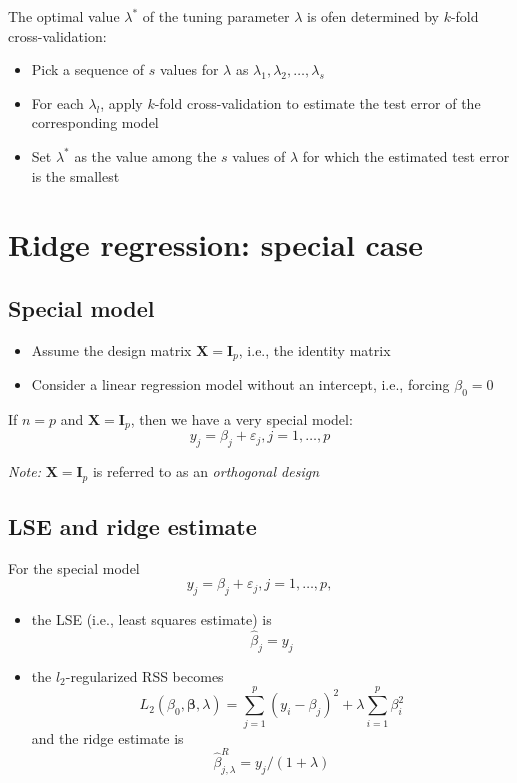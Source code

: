 \documentclass[]{article}
\providecommand{\tightlist}{%
  \setlength{\itemsep}{0pt}\setlength{\parskip}{0pt}}
\begin{document}
The optimal value \(\lambda^{\ast}\) of the tuning parameter \(\lambda\)
is ofen determined by \(k\)-fold cross-validation:

\begin{itemize}
\tightlist
\item
  Pick a sequence of \(s\) values for \(\lambda\) as
  \(\lambda_1, \lambda_2, \ldots, \lambda_s\)
\item
  For each \(\lambda_l\), apply \(k\)-fold cross-validation to estimate
  the test error of the corresponding model
\item
  Set \(\lambda^{\ast}\) as the value among the \(s\) values of
  \(\lambda\) for which the estimated test error is the smallest
\end{itemize}

\section{Ridge regression: special
case}\label{ridge-regression-special-case}

\subsection{Special model}\label{special-model}

\begin{itemize}
\tightlist
\item
  Assume the design matrix \(\mathbf{X}=\mathbf{I}_p\), i.e., the
  identity matrix
\item
  Consider a linear regression model without an intercept, i.e., forcing
  \(\beta_0=0\)
\end{itemize}

If \(n=p\) and \(\mathbf{X}=\mathbf{I}_p\), then we have a very special
model: \[y_j = \beta_j+\varepsilon_j,j=1,\ldots,p\]

\emph{Note:} \(\mathbf{X}=\mathbf{I}_p\) is referred to as an
\emph{orthogonal design}

\subsection{LSE and ridge estimate}\label{lse-and-ridge-estimate}

For the special model \[y_j = \beta_j+\varepsilon_j,j=1,\ldots,p,\]

\begin{itemize}
\tightlist
\item
  the LSE (i.e., least squares estimate) is \[\hat{\beta}_j=y_j\]
\item
  the \(l_2\)-regularized RSS becomes \[
  L_2(\beta_{0},\boldsymbol{\beta},\lambda)= \sum_{j=1}^p (y_i - \beta_j)^2 + \lambda \sum_{i=1}^p \beta_i^2
  \] and the ridge estimate is
  \[\hat{\beta}_{j,\lambda}^R=y_j/(1+\lambda)\]
\end{itemize}
\end{document}
